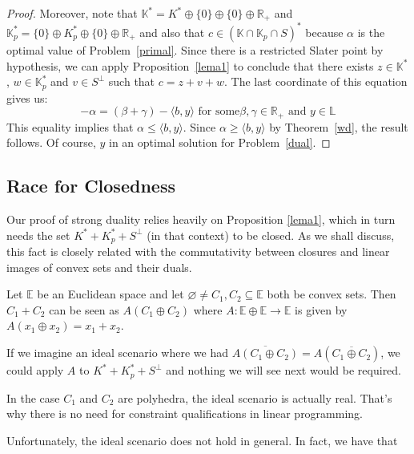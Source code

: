 \documentclass[a4paper]{article}
\begin{document}
\begin{proof}
 Moreover, note that
\mbox{\(\mathbb{K}^\ast=K^\ast\oplus\{0\} \oplus\{0\}\oplus\mathbb{R}_+ \)} and
\(\mathbb{K}_p^\ast=\{0\}\oplus K_p^\ast\oplus\{0\}\oplus\mathbb{R}_+\)  and also that  \mbox{$c\in(\mathbb{K}\cap\mathbb{K}_p\cap S)^\ast$} because \(\alpha\)
is the optimal value of Problem~\eqref{primal}.
  Since there is a
restricted Slater point by hypothesis, we can apply Proposition~\ref{lema1} to conclude that
there exists 
$z\in \mathbb{K}^\ast $, \(w\in\mathbb{K}_p^\ast\) and
$v\in S^\bot$ such that $c=z+v+w$. The last
coordinate of this equation gives us:
$$-\alpha= (\beta+\gamma) -\langle b,y\rangle\text{ for some
}\beta,\gamma\in\mathbb{R}_+\text{ and } y\in\mathbb{L} $$
This equality implies that  $\alpha\leq\langle b,y\rangle$. Since $\alpha\geq\langle b,y\rangle$ by Theorem~\ref{wd}, the result follows. Of
course, \(y\) in an optimal solution for Problem~\eqref{dual}.  
\end{proof}

\subsection*{Race for Closedness}

Our proof of strong duality relies heavily on Proposition \ref{lema1},
which in turn needs the set \mbox{\(K^\ast+K_p^\ast+S^\bot\)} (in
that context) to be closed. As we shall discuss, this fact is closely related with the
commutativity between closures and linear images of convex sets and their duals.

Let \(\mathbb{E}\) be an Euclidean space and let
\(\varnothing\not=C_1,C_2\subseteq\mathbb{E}\) both be convex sets. Then
\(C_1+C_2\) can be seen as \(A(C_1\oplus C_2)\) where
\(A\colon\mathbb{E}\oplus\mathbb{E}\to\mathbb{E}\)
is given by \(A(x_1\oplus x_2)=x_1+x_2\). 

If we imagine an ideal scenario where we had \(\overline{A(C_1\oplus
  C_2)}=A(\overline{C_1\oplus C_2})\), we could apply \(A\) to
\mbox{\(K^\ast+K_p^\ast+S^\bot\)} and nothing we will see next would be
required. 

\begin{remark}
  In the case \(C_1\) and \(C_2\) are polyhedra, the ideal scenario is
  actually real. That's why there is no need for constraint
  qualifications in linear programming. 
\end{remark}

Unfortunately, the ideal scenario does not hold in general. In fact, we have that
\end{document}

